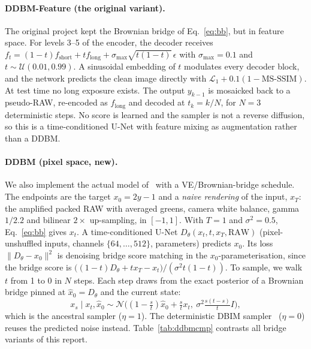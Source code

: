 \paragraph{DDBM-Feature (the original variant).} The original project kept the Brownian bridge of Eq.~\ref{eq:bb}, but in feature space. For levels 3--5 of the encoder, the decoder receives $f_t=(1-t)f_{\text{short}}+t f_{\text{long}}+\sigma_{\max}\sqrt{t(1-t)}\,\epsilon$ with $\sigma_{\max}=0.1$ and $t\sim\mathcal U(0.01,0.99)$. A sinusoidal embedding of $t$ modulates every decoder block, and the network predicts the clean image directly with $\mathcal L_1+0.1(1-\text{MS-SSIM})$. At test time no long exposure exists. The output $y_{k-1}$ is mosaicked back to a pseudo-RAW, re-encoded as $f_{\text{long}}$ and decoded at $t_k=k/N$, for $N=3$ deterministic steps. No score is learned and the sampler is not a reverse diffusion, so this is a time-conditioned U-Net with feature mixing as augmentation rather than a DDBM.

\paragraph{DDBM (pixel space, new).} We also implement the actual model of~\cite{zhou2024ddbm} with a VE/Brownian-bridge schedule. The endpoints are the target $x_0=2y-1$ and a \emph{naive rendering} of the input, $x_T$: the amplified packed RAW with averaged greens, camera white balance, gamma $1/2.2$ and bilinear $2\times$ up-sampling, in $[-1,1]$. With $T=1$ and $\sigma^2=0.5$, Eq.~\ref{eq:bb} gives $x_t$. A time-conditioned U-Net $D_\theta(x_t,t,x_T,\text{RAW})$ (pixel-unshuffled inputs, channels $\{64,\dots,512\}$, \DDBMPARAMS{} parameters) predicts $x_0$. Its loss $\|D_\theta-x_0\|^2$ is denoising bridge score matching in the $x_0$-parameterisation, since the bridge score is $\big((1-t)D_\theta+tx_T-x_t\big)/(\sigma^2t(1-t))$. To sample, we walk $t$ from 1 to 0 in $N$ steps. Each step draws from the exact posterior of a Brownian bridge pinned at $\hat x_0=D_\theta$ and the current state:
\begin{equation}
x_s \mid x_t,\hat x_0 \sim \mathcal N\!\Big((1-\tfrac st)\hat x_0 + \tfrac st x_t,\ \sigma^2\tfrac{s(t-s)}{t}I\Big),
\end{equation}
which is the ancestral sampler ($\eta=1$). The deterministic DBIM sampler~\cite{zheng2025dbim} ($\eta=0$) reuses the predicted noise instead. Table~\ref{tab:ddbmcmp} contrasts all bridge variants of this report.

